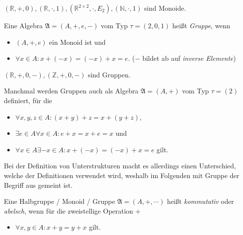 \begin{example}
    $(\mathbb{R}, +, 0), (\mathbb{R}, \cdot, 1), (\mathbb{R}^{2\times 2}, \cdot, E_2), (\mathbb{N}, \cdot, 1)$ sind Monoide.
\end{example}

\begin{definition}\label{def:gruppe}
    Eine Algebra $\mathfrak{A} = (A, +, e, -)$ vom Typ $\tau = (2,0,1)$ heißt \emph{Gruppe}, wenn
    \begin{itemize}[topsep=0pt, label={--}]
        \item $(A, +, e)$ ein Monoid ist und
        \item $\forall x \in A: x + (-x) = (-x) + x = e$. \tab ($-$ bildet ab auf \emph{inverse Elemente})
    \end{itemize}
\end{definition}

\begin{example}
    $(\mathbb{R},+, 0, -), (\mathbb{Z}, +, 0, -)$ sind Gruppen.
\end{example}

\begin{remark}\label{rem:alternativegruppe}
    Manchmal werden Gruppen auch als Algebra $\mathfrak{A} = (A, +)$ vom Typ $\tau = (2)$ definiert, für die
    \begin{itemize}[topsep=0pt, label={--}]
        \item $\forall x,y,z \in A: (x + y) + z = x + (y + z)$,
        \item $\exists e \in A \forall x \in A: e + x = x + e = x$ und 
        \item $\forall x \in A \exists -x \in A: x + (-x) = (-x) + x = e$ gilt.
    \end{itemize}
   Bei der Definition von Unterstrukturen macht es allerdings einen Unterschied, welche der Definitionen verwendet wird, weshalb im Folgenden mit Gruppe der Begriff aus  gemeint ist.
\end{remark}

\begin{definition}
    Eine Halbgruppe / Monoid / Gruppe $\mathfrak{A} = (A, +, \cdots)$ heißt \emph{kommutativ} oder \emph{abelsch}, wenn für die zweistellige Operation $+$ 
    \begin{itemize}[topsep=0pt, label={--}]
        \item $\forall x, y \in A: x + y = y + x$ gilt.
    \end{itemize}
\end{definition}

